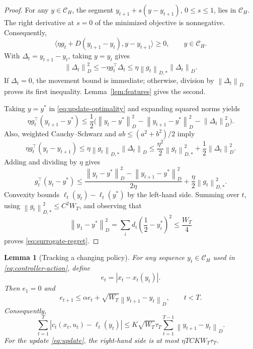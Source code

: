 \documentclass[11pt]{article}
\newtheorem{lemma}[theorem]{Lemma}
\newcommand{\CH}{\mathcal C_H}
\newcommand{\normD}[1]{\left\lVert #1\right\rVert_D}
\newcommand{\normDual}[1]{\left\lVert #1\right\rVert_{D,*}}
\begin{document}
\begin{proof}
For any $y\in\CH$, the segment
$y_{t+1}+s(y-y_{t+1})$, $0\le s\le1$, lies in $\CH$.
The right derivative at $s=0$ of the minimized objective is
nonnegative. Consequently,
\begin{equation}
\label{eq:update-optimality}
\langle \eta g_t+D(y_{t+1}-y_t),y-y_{t+1}\rangle
\ge0,
\qquad y\in\CH.
\end{equation}
With $\Delta_t=y_{t+1}-y_t$, taking $y=y_t$ gives
\[
\normD{\Delta_t}^2
\le-\eta g_t^\top\Delta_t
\le\eta\normDual{g_t}\normD{\Delta_t}.
\]
If $\Delta_t=0$, the movement bound is immediate; otherwise,
division by $\normD{\Delta_t}$ proves its first inequality.
Lemma~\ref{lem:features} gives the second.

Taking $y=y^*$ in \eqref{eq:update-optimality} and expanding
squared norms yields
\[
\eta g_t^\top(y_{t+1}-y^*)
\le\frac12\bigl(
\normD{y_t-y^*}^2-\normD{y_{t+1}-y^*}^2
-\normD{\Delta_t}^2\bigr).
\]
Also, weighted Cauchy--Schwarz and
$ab\le(a^2+b^2)/2$ imply
\[
\eta g_t^\top(y_t-y_{t+1})
\le\eta\normDual{g_t}\normD{\Delta_t}
\le\frac{\eta^2}{2}\normDual{g_t}^2
+\frac12\normD{\Delta_t}^2.
\]
Adding and dividing by $\eta$ gives
\[
g_t^\top(y_t-y^*)
\le
\frac{\normD{y_t-y^*}^2-\normD{y_{t+1}-y^*}^2}{2\eta}
+\frac{\eta}{2}\normDual{g_t}^2.
\]
Convexity bounds
$\ell_t(y_t)-\ell_t(y^*)$ by the left-hand side.
Summing over $t$, using
$\normDual{g_t}^2\le C^2W_T$, and observing that
\[
\normD{y_1-y^*}^2
=
\sum_i d_i\left(\frac12-y_i^*\right)^2
\le\frac{W_T}{4}
\]
proves \eqref{eq:surrogate-regret}.
\end{proof}

\begin{lemma}[Tracking a changing policy]
\label{lem:tracking}
For any sequence $y_t\in\CH$ used in
\eqref{eq:controller-action}, define
\[
e_t=|x_t-x_t(y_t)|.
\]
Then $e_1=0$ and
\begin{equation}
\label{eq:tracking-step}
e_{t+1}
\le\alpha e_t+\sqrt{W_T}\normD{y_{t+1}-y_t},
\qquad t<T.
\end{equation}
Consequently,
\begin{equation}
\label{eq:tracking-loss}
\sum_{t=1}^T
|c_t(x_t,u_t)-\ell_t(y_t)|
\le
K\sqrt{W_T}\tau_T
\sum_{t=1}^{T-1}\normD{y_{t+1}-y_t}.
\end{equation}
For the update \eqref{eq:update}, the right-hand side is at most
$\eta TCKW_T\tau_T$.
\end{lemma}
\end{document}
